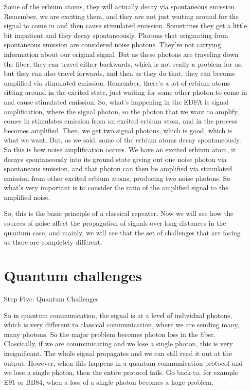 Some of the erbium atoms, they will actually decay via spontaneous emission. Remember, we are exciting them, and they are not just waiting around for the signal to come in and then cause stimulated emission. Sometimes they get a little bit impatient and they decay spontaneously. Photons that originating from spontaneous emission are considered noise photons. They're not carrying information about our original signal. But as these photons are traveling down the fiber, they can travel either backwards, which is not really a problem for us, but they can also travel forwards, and then as they do that, they can become amplified via stimulated emission. Remember, there's a lot of erbium atoms sitting around in the excited state, just waiting for some other photon to come in and cause stimulated emission. So, what's happening in the EDFA is signal amplification, where the signal photon, so the photon that we want to amplify, comes in stimulates emission from an excited erbium atom, and in the process becomes amplified. Then, we get two signal photons, which is good, which is what we want. But, as we said, some of the erbium atoms decay spontaneously. So this is how noise amplification occurs. We have an excited erbium atom, it decays spontaneously into its ground state giving out one noise photon via spontaneous emission, and that photon can then be amplified via stimulated emission from other excited erbium atoms, producing two noise photons. So what's very important is to consider the ratio of the amplified signal to the amplified noise.

So, this is the basic principle of a classical repeater. Now we will see how the sources of noise affect the propagation of signals over long distances in the quantum case, and mainly, we will see that the set of challenges that are facing us there are completely different.



\section{Quantum challenges}

Step Five: Quantum Challenges

So in quantum communication, the signal is at a level of individual photons, which is very different to classical communication, where we are sending many, many photons. So the major problem becomes photon loss in the fiber. Classically, if we are communicating and we lose a single photon, this is very insignificant. The whole signal propagates and we can still read it out at the output. However, when this happens in a quantum communication protocol and we lose a single photon, then the entire protocol fails. Go back to, for example E91 or BB84, when a loss of a single photon becomes a huge problem.

